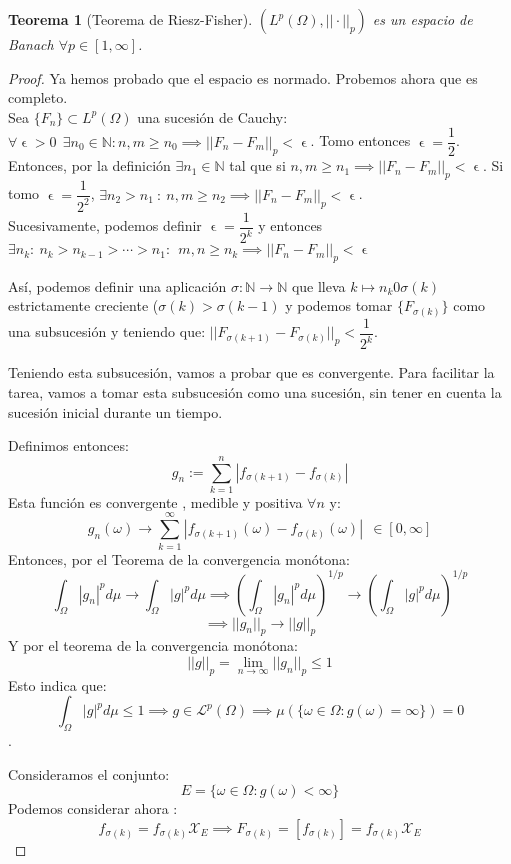 \documentclass[11pt, a4paper]{article}
\let\epsilon\upvarepsilon
\theoremstyle{theorem-style}
\newtheorem{nth}{Teorema}[section]
\theoremstyle{definition-style}
\theoremstyle{remark-style}
\theoremstyle{example-style}
\begin{document}
\begin{nth}[Teorema de Riesz-Fisher]
  $( L^p(\Omega), || \cdot ||_p)$ es un espacio de Banach $\forall p \in [1,\infty]$.
\end{nth}
\begin{proof}
  Ya hemos probado que el espacio es normado. Probemos ahora que es completo.\\
  
  Sea $\{ F_n\} \subset L^p(\Omega)$ una sucesión de Cauchy: $\forall \epsilon > 0 \ \ \exists n_0 \in \mathbb N : n,m \geq n_0 \implies || F_n - F_m ||_p < \epsilon$.
  Tomo entonces $\epsilon = \dfrac{1}{2}$. Entonces, por la definición $\exists n_1 \in \mathbb N$ tal que si $n,m \geq n_1 \implies || F_n - F_m ||_p < \epsilon $.
  Si tomo $\epsilon = \dfrac{1}{2^2}$, $\exists n_2 > n_1 \ : \ n,m \geq n_2 \implies || F_n - F_m ||_p < \epsilon$.\\
  Sucesivamente, podemos definir $\epsilon= \dfrac{1}{2^k}$ y entonces $\exists n_k : \ n_k > n_{k-1} > \cdots > n_1 : \ \ m,n \geq n_k \implies || F_n - F_m ||_p < \epsilon$
  
  Así, podemos definir una aplicación $\sigma: \mathbb N \to \mathbb N$ que lleva $k \mapsto n_k 0 \sigma(k)$ estrictamente creciente ($\sigma(k) > \sigma(k-1)$ y podemos tomar $\{F_{\sigma(k)}\}$ como una subsucesión y teniendo que: $|| F_{\sigma(k+1)} - F_{\sigma(k)} ||_p < \dfrac{1}{2^k}$.
  
  Teniendo esta subsucesión, vamos a probar que es convergente. Para facilitar la tarea, vamos a tomar esta subsucesión como una sucesión, sin tener en cuenta la sucesión inicial durante un tiempo.
  
  Definimos entonces:
  \[
    g_n := \sum_{k=1}^n |f_{\sigma(k+1)} - f_{\sigma(k)}|
  \]
  Esta función es convergente , medible y positiva $\forall n$ y:
  \[
    g_n(\omega) \to \sum_{k=1}^\infty |f_{\sigma(k+1)}(\omega) - f_{\sigma(k)}(\omega)| \ \ \in [0,\infty]
  \]
  Entonces, por el Teorema de la convergencia monótona:
  \[
    \int_\Omega |g_n|^p d\mu \to \int_\Omega |g|^p d\mu \implies (\int_\Omega |g_n|^p d\mu)^{1/p} \to (\int_\Omega |g|^p d\mu)^{1/p} 
  \]
  \[
    \implies ||g_n||_p \to ||g||_p
  \]
  Y por el teorema de la convergencia monótona:
  \[
    ||g||_p = \lim_{n\to \infty} ||g_n||_p \leq 1  
  \]
  Esto indica que:
  \[
    \int_\Omega |g|^p d\mu \leq 1 \implies g \in \mathcal L ^p(\Omega) \implies \mu(\{ \omega \in \Omega : g(\omega) = \infty\}) = 0
  \].
  
  Consideramos el conjunto:
  \[
    E = \{ \omega \in \Omega : g(\omega) < \infty\}
  \]	
  Podemos considerar ahora :
  \[
    f_{\sigma(k)} = f_{\sigma(k)} \mathcal X _E \implies F_{\sigma(k)} = [f_{\sigma(k)}] = f_{\sigma(k)} \mathcal X _E
  \]
  

\end{proof}
\end{document}
